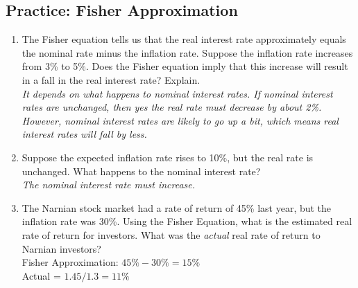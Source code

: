 \documentclass[11pt]{article}
\theoremstyle{definition}
\begin{document}
    \begin{shaded}
        \subsection{Practice: Fisher Approximation}
        
        \begin{enumerate}
        \item The Fisher equation tells us that the real interest rate approximately
        equals the nominal rate minus the inflation rate.   Suppose the inflation 
        rate increases from 3\% to 5\%.   Does the Fisher equation imply that this 
        increase will result in a fall in the real interest rate?   Explain.\\
         
        \textit{It depends on what happens to nominal interest rates.   If nominal interest rates are unchanged, then yes the real rate must decrease by about 2\%.   However, nominal interest rates are likely to go up a bit, which means real interest rates will fall by less.}
        
        \item Suppose the expected inflation rate rises to 10\%, but the real rate is unchanged.   What happens to the nominal interest rate?\\
        
        \textit{The nominal interest rate must increase.}
        \item The Narnian stock market had a rate of return of 45\% last year, but the inflation rate was 30\%. Using the Fisher Equation, what is the estimated real rate of return for investors.   What was the \textit{actual} real rate of return to Narnian investors?\\
        
        Fisher Approximation: $45\% - 30\% = 15\%$\\
        Actual = $1.45/1.3 = 11\%$
        \end{enumerate}
    \end{shaded}
\end{document}
